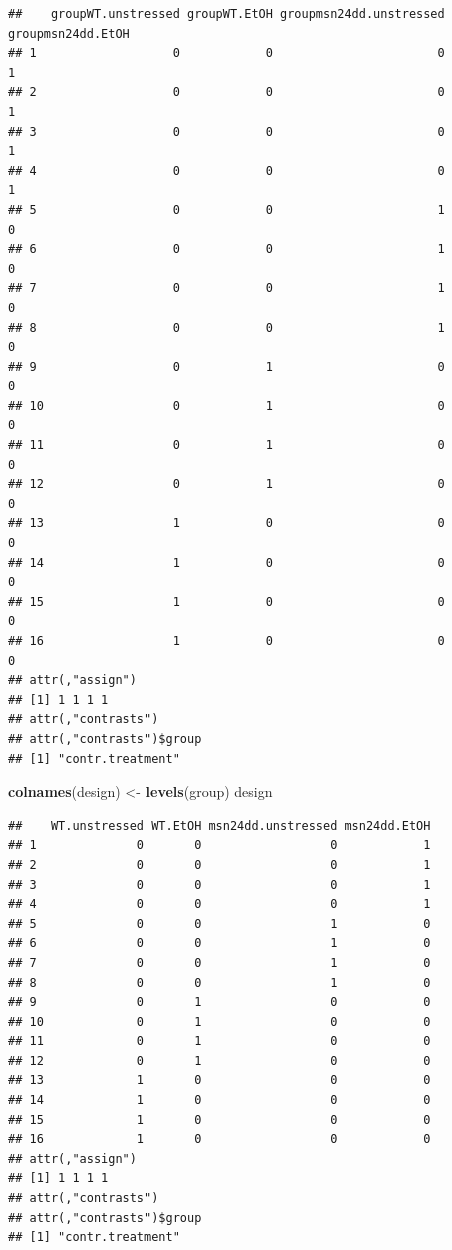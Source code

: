 \documentclass[
]{book}
\newenvironment{Shaded}{\begin{snugshade}}{\end{snugshade}}
\newcommand{\FunctionTok}[1]{\textcolor[rgb]{0.13,0.29,0.53}{\textbf{#1}}}
\newcommand{\NormalTok}[1]{#1}
\newcommand{\OtherTok}[1]{\textcolor[rgb]{0.56,0.35,0.01}{#1}}
\begin{document}
\begin{verbatim}
##    groupWT.unstressed groupWT.EtOH groupmsn24dd.unstressed groupmsn24dd.EtOH
## 1                   0            0                       0                 1
## 2                   0            0                       0                 1
## 3                   0            0                       0                 1
## 4                   0            0                       0                 1
## 5                   0            0                       1                 0
## 6                   0            0                       1                 0
## 7                   0            0                       1                 0
## 8                   0            0                       1                 0
## 9                   0            1                       0                 0
## 10                  0            1                       0                 0
## 11                  0            1                       0                 0
## 12                  0            1                       0                 0
## 13                  1            0                       0                 0
## 14                  1            0                       0                 0
## 15                  1            0                       0                 0
## 16                  1            0                       0                 0
## attr(,"assign")
## [1] 1 1 1 1
## attr(,"contrasts")
## attr(,"contrasts")$group
## [1] "contr.treatment"
\end{verbatim}

\begin{Shaded}
\begin{Highlighting}[]
\FunctionTok{colnames}\NormalTok{(design) }\OtherTok{\textless{}{-}} \FunctionTok{levels}\NormalTok{(group)}
\NormalTok{design}
\end{Highlighting}
\end{Shaded}

\begin{verbatim}
##    WT.unstressed WT.EtOH msn24dd.unstressed msn24dd.EtOH
## 1              0       0                  0            1
## 2              0       0                  0            1
## 3              0       0                  0            1
## 4              0       0                  0            1
## 5              0       0                  1            0
## 6              0       0                  1            0
## 7              0       0                  1            0
## 8              0       0                  1            0
## 9              0       1                  0            0
## 10             0       1                  0            0
## 11             0       1                  0            0
## 12             0       1                  0            0
## 13             1       0                  0            0
## 14             1       0                  0            0
## 15             1       0                  0            0
## 16             1       0                  0            0
## attr(,"assign")
## [1] 1 1 1 1
## attr(,"contrasts")
## attr(,"contrasts")$group
## [1] "contr.treatment"
\end{verbatim}
\end{document}
